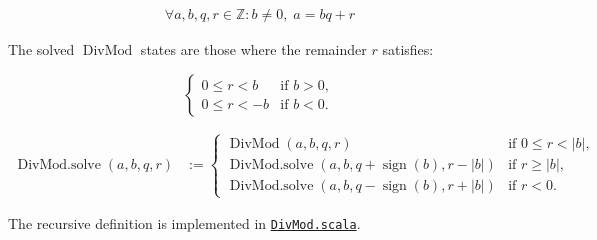 \begin{equation*}
\begin{aligned}
\forall a,b,q,r \in \mathbb{Z} : b \neq 0,\; a = bq + r
\end{aligned}
\end{equation*}

The solved $\operatorname{DivMod}$ states are those where the remainder $r$
satisfies:

\begin{equation*}
\begin{cases}
0 \leq r < b & \text{if } b > 0, \\
0 \leq r < -b & \text{if } b < 0.
\end{cases}
\end{equation*}

\begin{equation*}
\begin{aligned}
\operatorname{DivMod.solve}(a,b,q,r) &:={}
\begin{cases}
\operatorname{DivMod}(a,b,q,r) & \text{if } 0 \leq r < \lvert b\rvert, \\
\operatorname{DivMod.solve}(a,b,q+\operatorname{sign}(b),r-\lvert b\rvert)
  & \text{if } r \geq \lvert b\rvert, \\
\operatorname{DivMod.solve}(a,b,q-\operatorname{sign}(b),r+\lvert b\rvert)
  & \text{if } r < 0.
\end{cases}
\end{aligned}
\end{equation*}

The recursive definition is implemented in
\href{https://github.com/thiagomata/prime-numbers/blob/modulo-article-v1.0.0/src/main/scala/v1/chapter2/div/DivMod.scala}{\texttt{DivMod.scala}}.
